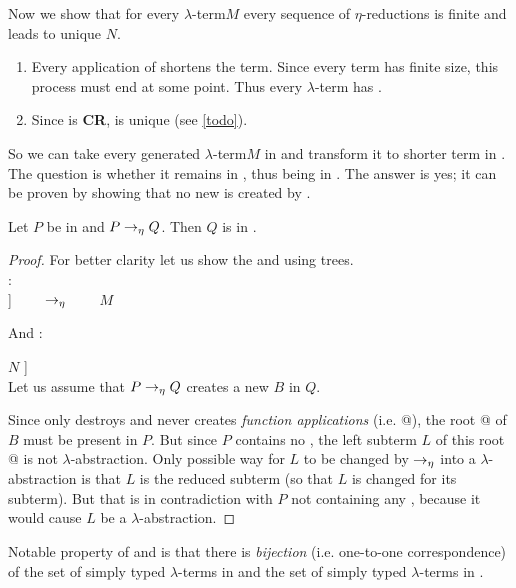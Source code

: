 \documentclass[12pt,a4paper]{report}
\newcommand{\Lets}{Let us\xspace}
\newcommand{\lets}{let us\xspace}
\newcommand{\lterm}{$\lambda$-term\xspace}
\newcommand{\lterms}{$\lambda$-terms\xspace}
\newcommand{\lh}[1]{\lambda #1}
\begin{document}
Now we show that for every \lterm $M$ 
every sequence of $\eta$-reductions is finite and
leads to unique \enf $N$.

\begin{enumerate}
 \item Every application of \ered shortens the term.
       Since every term has finite size, this process must 
       end at some point. Thus every \lterm has \enf.
 \item Since \ered is \textbf{CR}, \enf is unique (see \ref{todo}). 
\end{enumerate}

So we can take every generated \lterm $M$ in 
\lnf and transform it to shorter term in \enf. 
The question is whether it remains in \bnf, thus being in \benf.
The answer is yes; it can be proven by showing that no 
new \bredex is created by \ered.  

\begin{proposition}
Let $P$ be in \bnf and $P \rightarrow_\eta Q$. Then $Q$ is in \bnf.    
\end{proposition}
\begin{proof}

For better clarity \lets show the \ered and \bredex using trees.\\
\ered: \\

\Tree [.$\lh{x}$ [.@ $M$ $x$ ] ] 
~~~~$\rightarrow_\eta$~~~~
$M$ 

And \bredex:

\Tree [.@ [.$\lh{x}$ $M$ ] $N$ ] \\

\Lets assume that $P \rightarrow_\eta Q$ creates a new \bredex $B$ in $Q$.

Since \ered only destroys and never creates \textit{function applications} (i.e. @),
the root @ of $B$ must be present in $P$.  
But since $P$ contains no \bredex, the left subterm $L$ of this root @
is not $\lambda$-abstraction.
Only possible way for $L$ to be changed by $\rightarrow_\eta$ into 
a $\lambda$-abstraction is that $L$ is the reduced subterm (so that
$L$ is changed for its subterm).
But that is in contradiction with $P$ not containing any \bredex,
because it would cause $L$ be a $\lambda$-abstraction.

\end{proof}

Notable property of \lnf and \benf is that there is \textit{bijection} 
(i.e. one-to-one correspondence) of 
the set of simply typed \lterms in \lnf and 
the set of simply typed \lterms in \benf.
\end{document}
